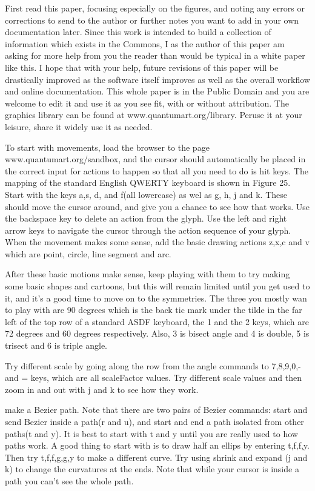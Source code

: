 \documentclass[11pt]{article}
\begin{document}
First read this paper, focusing especially on the figures, and noting any errors or corrections to send to the author or further notes you want to add in your own documentation later.  Since this work is intended to build a collection of information which exists in the Commons, I as the author of this paper am asking for more help from you the reader than would be typical in a white paper like this. I hope that with your help, future revisions of this paper will be drastically improved as the software itself improves as well as the overall workflow and online documentation.  This whole paper is in the Public Domain and you are welcome to edit it and use it as you see fit, with or without attribution.  
The graphics library can be found at www.quantumart.org/library.  Peruse it at your leisure, share it widely use it as needed.  

To start with movements, load the browser to the page www.quantumart.org/sandbox, and the cursor should automatically be placed in the correct input for actions to happen so that all you need to do is hit keys.  The mapping of the standard English QWERTY keyboard is shown in Figure 25.  Start with the keys a,s, d, and f(all lowercase) as wel as g, h, j and k.  These should move the cursor around, and give you a chance to see how that works.  Use the backspace key to delete an action from the glyph.  Use the left and right arrow keys to navigate the cursor through the action sequence of your glyph.  When the movement makes some sense, add the basic drawing actions z,x,c and v which are point, circle, line segment and arc.  

After these basic motions make sense, keep playing with them to try making some basic shapes and cartoons, but this will remain limited until you get used to it, and it's a good time to move on to the symmetries.  The three you mostly wan to play with are 90 degrees which is the back tic mark under the tilde in the far left of the top row of a standard ASDF keyboard, the 1 and the 2 keys, which are 72 degrees and 60 degrees respectively.  Also, 3 is bisect angle and 4 is double, 5 is trisect and 6 is triple angle.

Try different scale by going along the row from the angle commands to 7,8,9,0,- and = keys, which are all scaleFactor values.  Try different scale values and then zoom in and out with j and k to see how they work.  

make a Bezier path.  Note that there are two pairs of Bezier commands: start and send Bezier inside a path(r and u), and start and end a path isolated from other paths(t and y).  It is best to start with t and y until you are really used to how paths work.  A good thing to start with is to draw half an ellips by entering t,f,f,y.  Then try t,f,f,g,g,y to make a different curve.  Try using shrink and expand (j and k) to change the curvatures at the ends.  Note that while your cursor is inside a path you can't see the whole path.    
\end{document}
